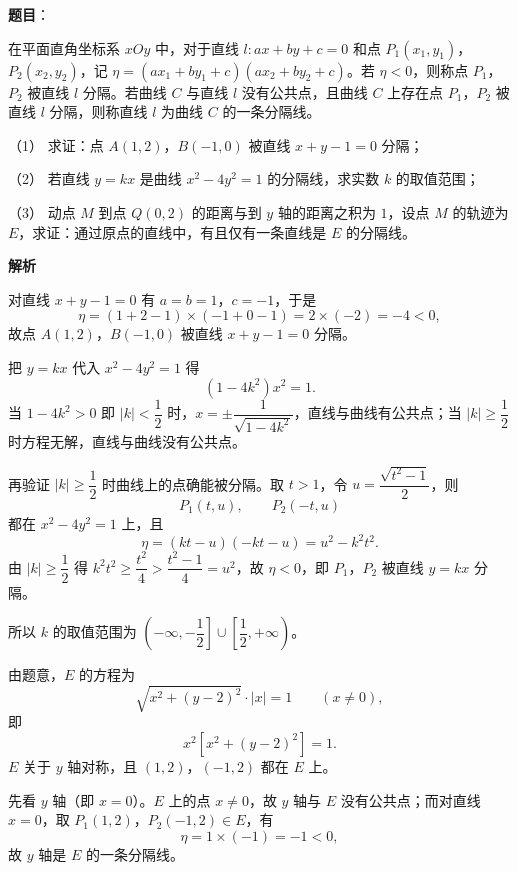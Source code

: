 \begin{answer}

\textbf{题目}：

在平面直角坐标系 $xOy$ 中，对于直线 $l:ax+by+c=0$ 和点 $P_1(x_1,y_1)$，$P_2(x_2,y_2)$，记 $\eta=(ax_1+by_1+c)(ax_2+by_2+c)$。若 $\eta<0$，则称点 $P_1$，$P_2$ 被直线 $l$ 分隔。若曲线 $C$ 与直线 $l$ 没有公共点，且曲线 $C$ 上存在点 $P_1$，$P_2$ 被直线 $l$ 分隔，则称直线 $l$ 为曲线 $C$ 的一条分隔线。

（1） 求证：点 $A(1,2)$，$B(-1,0)$ 被直线 $x+y-1=0$ 分隔；

（2） 若直线 $y=kx$ 是曲线 $x^2-4y^2=1$ 的分隔线，求实数 $k$ 的取值范围；

（3） 动点 $M$ 到点 $Q(0,2)$ 的距离与到 $y$ 轴的距离之积为 $1$，设点 $M$ 的轨迹为 $E$，求证：通过原点的直线中，有且仅有一条直线是 $E$ 的分隔线。

\textbf{解析}


对直线 $x+y-1=0$ 有 $a=b=1$，$c=-1$，于是
\nopagebreak[4]
\[\eta=(1+2-1)\times(-1+0-1)=2\times(-2)=-4<0,\]
故点 $A(1,2)$，$B(-1,0)$ 被直线 $x+y-1=0$ 分隔。


把 $y=kx$ 代入 $x^2-4y^2=1$ 得
\nopagebreak[4]
\[(1-4k^2)x^2=1 .\]
当 $1-4k^2>0$ 即 $|k|<\dfrac12$ 时，$x=\pm\dfrac1{\sqrt{1-4k^2}}$，直线与曲线有公共点；当 $|k|\geqslant\dfrac12$ 时方程无解，直线与曲线没有公共点。

再验证 $|k|\geqslant\dfrac12$ 时曲线上的点确能被分隔。取 $t>1$，令 $u=\dfrac{\sqrt{t^2-1}}2$，则
\nopagebreak[4]
\[P_1(t,u),\qquad P_2(-t,u)\]
都在 $x^2-4y^2=1$ 上，且
\nopagebreak[4]
\[\eta=(kt-u)(-kt-u)=u^2-k^2t^2 .\]
由 $|k|\geqslant\dfrac12$ 得 $k^2t^2\geqslant\dfrac{t^2}4>\dfrac{t^2-1}4=u^2$，故 $\eta<0$，即 $P_1$，$P_2$ 被直线 $y=kx$ 分隔。

所以 $k$ 的取值范围为 $\left(-\infty,-\dfrac12\right]\cup\left[\dfrac12,+\infty\right)$。


由题意，$E$ 的方程为
\nopagebreak[4]
\[\sqrt{x^2+(y-2)^2}\cdot|x|=1\qquad(x\neq0),\]
即
\nopagebreak[4]
\[x^2\left[x^2+(y-2)^2\right]=1 .\]
$E$ 关于 $y$ 轴对称，且 $(1,2)$，$(-1,2)$ 都在 $E$ 上。

先看 $y$ 轴（即 $x=0$）。$E$ 上的点 $x\neq0$，故 $y$ 轴与 $E$ 没有公共点；而对直线 $x=0$，取 $P_1(1,2)$，$P_2(-1,2)\in E$，有
\nopagebreak[4]
\[\eta=1\times(-1)=-1<0,\]
故 $y$ 轴是 $E$ 的一条分隔线。


\end{answer}
